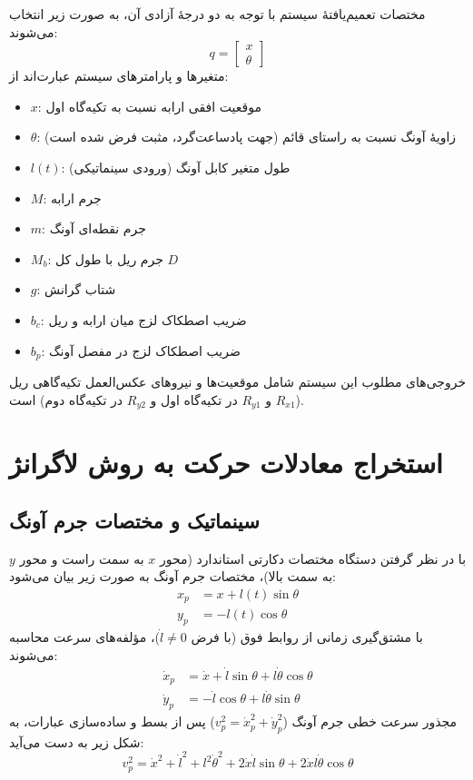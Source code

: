 مختصات تعمیم‌یافتهٔ سیستم با توجه به دو درجهٔ آزادی آن، به صورت زیر انتخاب می‌شوند:
\[
    q = \begin{bmatrix} x \\ \theta \end{bmatrix}
\]
متغیرها و پارامترهای سیستم عبارت‌اند از:
\begin{itemize}
    \item $x$: موقعیت افقی ارابه نسبت به تکیه‌گاه اول
    \item $\theta$: زاویهٔ آونگ نسبت به راستای قائم (جهت پادساعت‌گرد، مثبت فرض شده است)
    \item $l(t)$: طول متغیر کابل آونگ (ورودی سینماتیکی)
    \item $M$: جرم ارابه
    \item $m$: جرم نقطه‌ای آونگ
    \item $M_b$: جرم ریل با طول کل $D$
    \item $g$: شتاب گرانش
    \item $b_c$: ضریب اصطکاک لزج میان ارابه و ریل
    \item $b_p$: ضریب اصطکاک لزج در مفصل آونگ
\end{itemize}

خروجی‌های مطلوب این سیستم شامل موقعیت‌ها و نیروهای عکس‌العمل تکیه‌گاهی ریل ($R_{x1}$ و $R_{y1}$ در تکیه‌گاه اول و $R_{y2}$ در تکیه‌گاه دوم) است.

\section{استخراج معادلات حرکت به روش لاگرانژ}

\subsection{سینماتیک و مختصات جرم آونگ}

با در نظر گرفتن دستگاه مختصات دکارتی استاندارد (محور $x$ به سمت راست و محور $y$ به سمت بالا)، مختصات جرم آونگ به صورت زیر بیان می‌شود:
\begin{align*}
    x_p & = x + l(t) \sin\theta \\
    y_p & = -l(t) \cos\theta
\end{align*}
با مشتق‌گیری زمانی از روابط فوق (با فرض $\dot{l} \neq 0$)، مؤلفه‌های سرعت محاسبه می‌شوند:
\begin{align*}
    \dot{x}_p & = \dot{x} + \dot{l}\sin\theta + l\dot{\theta}\cos\theta \\
    \dot{y}_p & = -\dot{l}\cos\theta + l\dot{\theta}\sin\theta
\end{align*}
مجذور سرعت خطی جرم آونگ ($v_p^2 = \dot{x}_p^2 + \dot{y}_p^2$) پس از بسط و ساده‌سازی عبارات، به شکل زیر به دست می‌آید:
\[
    v_p^2 = \dot{x}^2 + \dot{l}^2 + l^2\dot{\theta}^2 + 2\dot{x}\dot{l}\sin\theta + 2\dot{x}l\dot{\theta}\cos\theta
\]

